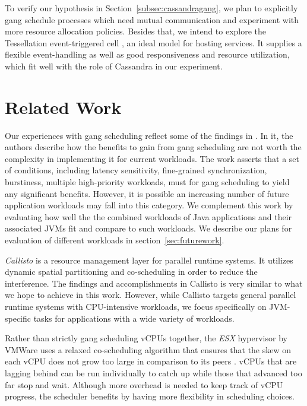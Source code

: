 \documentclass{sig-alternate}
\begin{document}
To verify our hypothesis in Section~\ref{subsec:cassandragang}, we plan to explicitly gang schedule processes which need mutual communication and experiment with more resource allocation policies. Besides that, we intend to explore the Tessellation event-triggered cell \cite{colmenares2013tessellation}, an ideal model for hosting services. It supplies a flexible event-handling as well as good responsiveness and resource utilization, which fit well with the role of Cassandra in our experiment.

\section{Related Work} \label{sec:relatedwork}
Our experiences with gang scheduling reflect some of the findings in \cite{peter2011technical}. In it, the authors describe how the benefits to gain from gang scheduling are not worth the complexity in implementing it for current workloads. The work asserts that a set of conditions, including latency sensitivity, fine-grained synchronization, burstiness, multiple high-priority workloads, must for gang scheduling to yield any significant benefits. However, it is possible an increasing number of future application workloads may fall into this category. We complement this work by evaluating how well the the combined workloads of Java applications and their associated JVMs fit and compare to such workloads. We describe our plans for evaluation of different workloads in section~\ref{sec:futurework}.

\textit{Callisto} is a resource management layer for parallel runtime systems. It utilizes dynamic spatial partitioning and co-scheduling in order to reduce the interference. The findings and accomplishments in Callisto is very similar to what we hope to achieve in this work. However, while Callisto targets general parallel runtime systems with CPU-intensive workloads, we focus specifically on JVM-specific tasks for applications with a wide variety of workloads.

Rather than strictly gang scheduling vCPUs together, the \textit{ESX} hypervisor by VMWare  uses a relaxed co-scheduling algorithm that ensures that the skew on each vCPU does not grow too large in comparison to its peers \cite{vmware:whitepaper}. vCPUs that are lagging behind can be run individually to catch up while those that advanced too far stop and wait. Although more overhead is needed to keep track of vCPU progress, the scheduler benefits by having more flexibility in scheduling choices.
\end{document}

